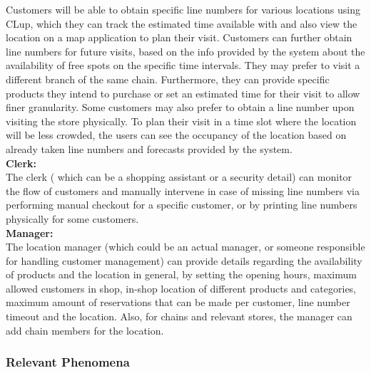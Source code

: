 Customers will be able to obtain specific line numbers for various locations using CLup, which they can track the estimated time available with and also view the location on a map application to plan their visit.
Customers can further obtain line numbers for future visits, based on the info provided by the system about the availability of free spots on the specific time intervals.
They may prefer to visit a different branch of the same chain.
Furthermore, they can provide specific products they intend to purchase or set an estimated time for their visit to allow finer granularity.
Some customers may also prefer to obtain a line number upon visiting the store physically.
To plan their visit in a time slot where the location will be less crowded, the users can see the occupancy of the location based on already taken line numbers and forecasts provided by the system.
\\[0.5cm]
\textbf{Clerk:} \\
The clerk ( which can be a shopping assistant or a security detail) can monitor the flow of customers and manually intervene in case of missing line numbers via performing manual checkout for a specific customer, or by printing line numbers physically for some customers.
\\[0.5cm]
\textbf{Manager:} \\

The location manager (which could be an actual manager, or someone responsible for handling customer management) can provide details regarding the availability of products and the location in general, by setting the opening hours, maximum allowed customers in shop, in-shop location of different products and categories, maximum amount of reservations that can be made per customer, line number timeout and the location.
Also, for chains and relevant stores, the manager can add chain members for the location.

\subsubsection{Relevant Phenomena}


